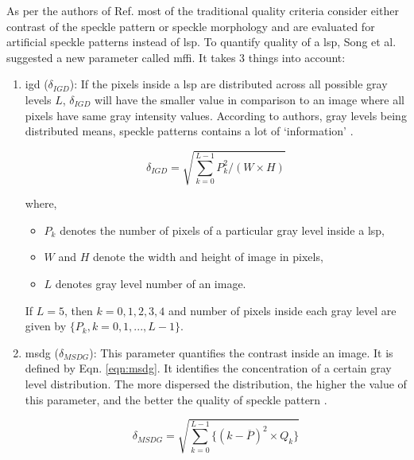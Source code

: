         As per the authors of Ref. \cite{song} most of the traditional quality criteria consider either contrast of the speckle pattern or speckle morphology and are evaluated for artificial speckle patterns instead of \gls{lsp}. To quantify quality of a \gls{lsp}, Song et al. suggested a new parameter called \gls{mffi}. It takes 3 things into account:
        \begin{enumerate}
            
            \item \gls{igd} ($\delta_{IGD}$): If the pixels inside a \gls{lsp} are distributed across all possible gray levels $L$, $\delta_{IGD}$ will have the smaller value in comparison to an image where all pixels have same gray intensity values. According to authors, gray levels being distributed means, speckle patterns contains a lot of `information' \cite{song}.
                
                \begin{equation}
                    \delta_{IGD} = \sqrt{\sum_{k=0}^{L-1} P_{k}^{2} / (W \times H)}
                \end{equation}
                
                \noindent where, 
                \begin{itemize}
                    \item $P_k$ denotes the number of pixels of a particular gray level inside a \gls{lsp},
                    \item $W$ and $H$ denote the width and height of image in pixels,
                    \item $L$ denotes gray level number of an image.
                \end{itemize}

                \noindent If $L = 5$, then $k = {0, 1, 2, 3, 4}$ and number of pixels inside each gray level are given by \(\{P_k, k = 0, 1, ... , L-1\}\).

            \item \gls{msdg} ($\delta_{MSDG}$): This parameter quantifies the contrast inside an image. It is defined by Eqn. \ref{eqn:msdg}. It identifies the concentration of a certain gray level distribution. The more dispersed the distribution, the higher the value of this parameter, and the better the quality of speckle pattern \cite{song}. 
                
                \begin{equation}
                    \delta_{MSDG} = \sqrt{\sum_{k=0}^{L-1} \biggl\{ (k - \overline{P})^2 \times Q_k \biggr\}}
                    \label{eqn:msdg}
                \end{equation}


\end{enumerate}
